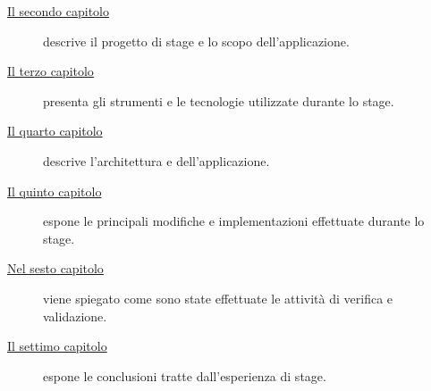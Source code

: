 \begin{description} 
    \item[{\hyperref[cap:descrizione-stage]{Il secondo capitolo}}] descrive il progetto di stage e lo scopo dell'applicazione.
    
    \item[{\hyperref[cap:tecnologie-strumenti]{Il terzo capitolo}}] presenta gli strumenti e le tecnologie utilizzate durante lo stage.
    
    \item[{\hyperref[cap:design]{Il quarto capitolo}}] descrive l'architettura e dell'applicazione.
    
    \item[{\hyperref[cap:codifica]{Il quinto capitolo}}] espone le principali modifiche e implementazioni effettuate durante lo stage.
    
    \item[{\hyperref[cap:verifica-validazione]{Nel sesto capitolo}}] viene spiegato come sono state effettuate le attività di verifica e validazione.
    
    \item[{\hyperref[cap:conclusioni]{Il settimo capitolo}}] espone le conclusioni tratte dall'esperienza di stage.
\end{description}
